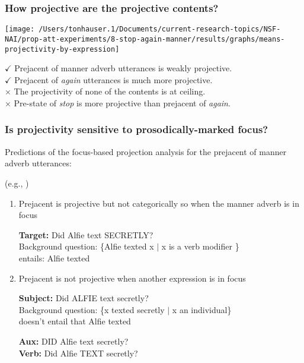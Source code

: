 \documentclass[pdf,xcolor=table,envcountsect,handout]{beamer}
\begin{document}
\begin{frame}
\frametitle{How projective are the projective contents?}

\hfill \begin{footnotesize}  \end{footnotesize}

\pause

\hspace*{1cm} \texttt{[image: /Users/tonhauser.1/Documents/current-research-topics/NSF-NAI/prop-att-experiments/8-stop-again-manner/results/graphs/means-projectivity-by-expression]}

\pause

{\bf $\checkmark$} Prejacent of manner adverb utterances is weakly projective.
\\[.02cm]
{\bf $\checkmark$} Prejacent of {\em again} utterances is much more projective.
\\[.02cm]
\pause
{\bf $\times$} The projectivity of none of the contents is at ceiling.
\\[.02cm]
{\bf $\times$} Pre-state of {\em stop} is more projective than prejacent of {\em again}.


\end{frame}

\begin{frame}
\frametitle{Is projectivity sensitive to prosodically-marked focus?}

Predictions of the focus-based projection analysis for the prejacent of manner adverb utterances: \hfill \begin{tiny} (e.g., \citealt{abrusan2013,best-question,stevens-etal2017}) \end{tiny}

\pause

\begin{enumerate}

\item Prejacent is projective but not categorically so when the manner adverb is in focus

{\bf Target:} Did Alfie text SECRETLY?
\pause
\\ Background question: \{Alfie texted x $|$ x is a verb modifier \}
\pause
\\ entails: Alfie texted

\pause

\item Prejacent is not projective when another expression is in focus

{\bf Subject:} Did ALFIE text secretly?
\pause
\\ Background question: \{x texted secretly $|$ x an individual\}
\pause
\\ doesn't entail that Alfie texted

\medskip
\pause

{\bf Aux:}  DID Alfie text secretly?
\\
{\bf Verb:} Did Alfie TEXT secretly?

\end{enumerate}

\end{frame}
\end{document}
